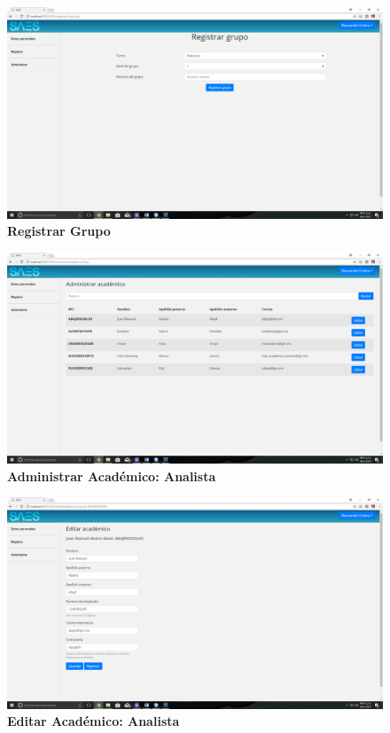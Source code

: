 \begin{figure}[H]
  \centering
    \includegraphics[scale=0.2]{project/images/37.png}
  \caption{\textbf{Registrar Grupo}}
\end{figure}
\begin{figure}[H]
  \centering
    \includegraphics[scale=0.2]{project/images/38.png}
  \caption{\textbf{Administrar Académico: Analista}}
\end{figure}
\begin{figure}[H]
  \centering
    \includegraphics[scale=0.2]{project/images/39.png}
  \caption{\textbf{Editar Académico: Analista}}
\end{figure}
